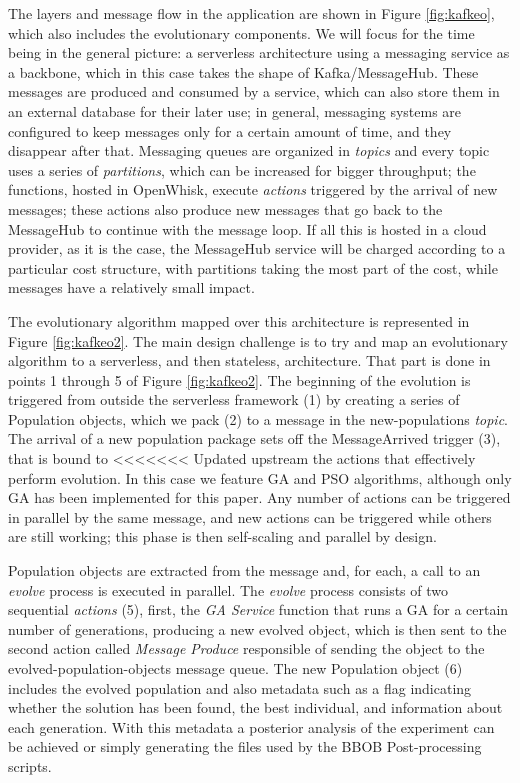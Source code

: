 \documentclass[sigconf]{acmart}
\begin{document}
The layers and message flow in the application are shown in Figure
\ref{fig:kafkeo}, which also includes the evolutionary components. We
will focus for the time being in the general picture: a serverless
architecture using  a messaging service as a backbone, which in this case
takes the shape of Kafka/MessageHub. These messages are produced and
consumed by a service, which can also store them in an external database
for their later use; in general, messaging systems are configured to
keep messages only for a certain amount of time, and they disappear
after that. Messaging queues are organized in {\em topics} and every
topic uses a series of {\em partitions}, which can be increased for
bigger throughput; the
functions, hosted in OpenWhisk, execute {\em actions} triggered by the
arrival of new messages; these actions also produce new messages that
go back to the MessageHub to continue with the message loop. If all
this is hosted in a cloud provider, as it is the case, the MessageHub
service will be charged according to a particular cost
structure, with partitions taking the most part of
the cost, while messages have a relatively small impact.

The evolutionary algorithm mapped over this architecture is 
represented in Figure \ref{fig:kafkeo2}. The main
design challenge is to try and map an evolutionary algorithm to a
serverless, and then stateless, architecture. That part is done in
points 1 through 5 of Figure \ref{fig:kafkeo2}. The beginning of the
evolution is triggered from outside the serverless framework (1) by
creating a series of Population objects, which we pack (2) to a message in the
{\sf new-populations} {\em topic}. The arrival of a new population
package sets off the {\sf MessageArrived} trigger (3), that is bound to
<<<<<<< Updated upstream
the actions that effectively perform evolution. In this case we
feature GA and PSO algorithms, although only GA has been implemented 
for this paper. Any number of actions can be triggered in parallel by the same message,
and new actions can be triggered while others are still working; this phase is
then self-scaling and parallel by design.

Population objects are extracted from the message and, for each, a call to
an {\em evolve} process is executed in parallel. The {\em evolve} process
consists of two sequential {\em actions} (5), first, the {\em GA Service} function that
runs a GA for a certain number of generations, producing a new evolved
object, which is then sent to the second action called {\em Message Produce}
 responsible of sending the object to the {\sf evolved-population-objects} 
 message queue.  The new Population object (6) includes
 the evolved population and also metadata such as a flag indicating
whether the solution has been found, the best individual, and information
about each generation. With this metadata a posterior analysis of the experiment
can be achieved or simply generating the files used by the BBOB Post-processing scripts.
\end{document}
